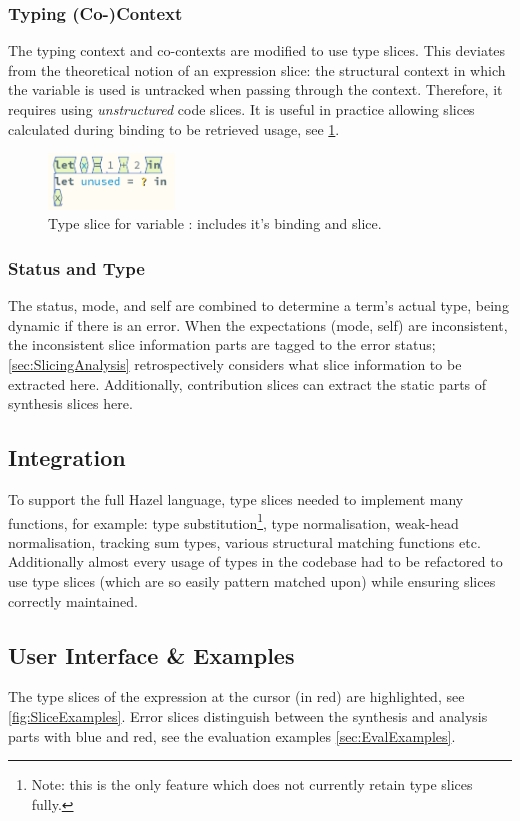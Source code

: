 \subsubsection{Typing (Co-)Context}
The typing context and co-contexts are modified to use type slices. This deviates from the theoretical notion of an expression slice: the structural context in which the variable is used is untracked when passing through the context. Therefore, it requires using \textit{unstructured} code slices. It is useful in practice allowing slices calculated during binding to be retrieved usage, see \cref{fig:VarSlice}.
\begin{figure}[h]
\centering
\includegraphics[width=0.3\textwidth]{Media/Figures/var_slice}
\caption{Type slice for variable : includes it's binding and slice.}
\label{fig:VarSlice}
\end{figure}

\subsubsection{Status and Type}
The status, mode, and self are combined to determine a term's actual type, being dynamic if there is an error. When the expectations (mode, self) are inconsistent, the inconsistent slice information parts are tagged to the error status; \cref{sec:SlicingAnalysis} retrospectively considers what slice information to be extracted here. Additionally, contribution slices can extract the static parts of synthesis slices here. 

\subsection{Integration}
To support the full Hazel language, type slices needed to implement many functions, for example: type substitution\footnote{Note: this is the only feature which does not currently retain type slices fully.}, type normalisation, weak-head normalisation, tracking sum types, various structural matching functions etc. Additionally almost every usage of types in the codebase had to be refactored to use type slices (which are so easily pattern matched upon) while ensuring slices correctly maintained.

\subsection{User Interface \& Examples}
The type slices of the expression at the cursor (in red) are highlighted, see \cref{fig:SliceExamples}. Error slices distinguish between the synthesis and analysis parts with blue and red, see the evaluation examples \cref{sec:EvalExamples}.

